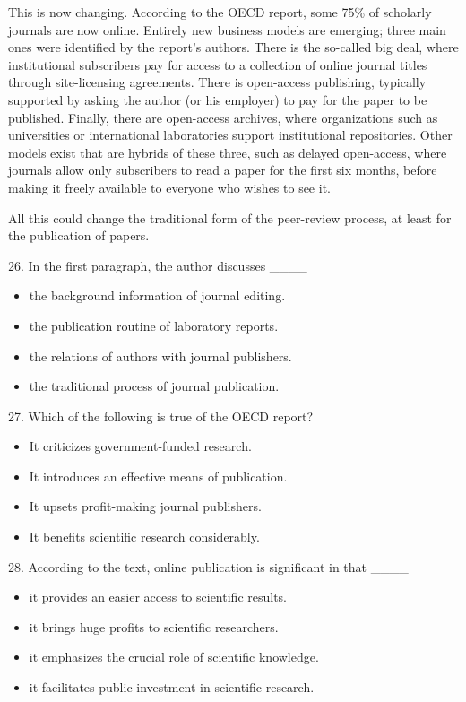 \documentclass[UTF8,11pt]{ctexart}
\begin{document}
This is now changing. According to the OECD report, some 75\% of scholarly journals are now online. Entirely new business models are emerging; three main ones were identified by the report’s authors. There is the so-called big deal, where institutional subscribers pay for access to a collection of online journal titles through site-licensing agreements. There is open-access publishing, typically supported by asking the author (or his employer) to pay for the paper to be published. Finally, there are open-access archives, where organizations such as universities or international laboratories support institutional repositories. Other models exist that are hybrids of these three, such as delayed open-access, where journals allow only subscribers to read a paper for the first six months, before making it freely available to everyone who wishes to see it.


All this could change the traditional form of the peer-review process, at least for the publication of papers.


26. In the first paragraph, the author discusses \_\_\_\_


\begin{itemize}[leftmargin=2em,itemsep=.2em,topsep=.4em]\item[A.] the background information of journal editing.
\item[B.] the publication routine of laboratory reports.
\item[C.] the relations of authors with journal publishers.
\item[D.] the traditional process of journal publication.
\end{itemize}

27. Which of the following is true of the OECD report?


\begin{itemize}[leftmargin=2em,itemsep=.2em,topsep=.4em]\item[A.] It criticizes government-funded research.
\item[B.] It introduces an effective means of publication.
\item[C.] It upsets profit-making journal publishers.
\item[D.] It benefits scientific research considerably.
\end{itemize}

28. According to the text, online publication is significant in that \_\_\_\_


\begin{itemize}[leftmargin=2em,itemsep=.2em,topsep=.4em]\item[A.] it provides an easier access to scientific results.
\item[B.] it brings huge profits to scientific researchers.
\item[C.] it emphasizes the crucial role of scientific knowledge.
\item[D.] it facilitates public investment in scientific research.
\end{itemize}
\end{document}
